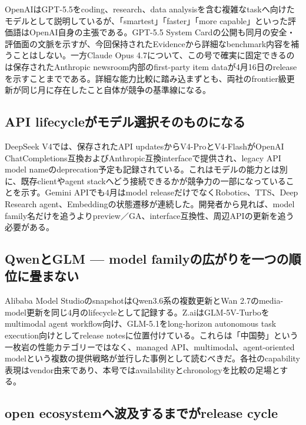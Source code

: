 OpenAIはGPT-5.5をcoding、research、data analysisを含む複雑なtaskへ向けたモデルとして説明しているが、「smartest」「faster」「more capable」といった評価語はOpenAI自身の主張である。GPT-5.5 System Cardの公開も同月の安全・評価面の文脈を示すが、今回保持されたEvidenceから詳細なbenchmark内容を補うことはしない。一方Claude Opus 4.7について、この号で確実に固定できるのは保存されたAnthropic newsroom内部のfirst-party item dataが4月16日のreleaseを示すことまでである。詳細な能力比較に踏み込まずとも、両社のfrontier級更新が同じ月に存在したこと自体が競争の基準線になる。\autocite{src-a07eb39dec04,src-dfe7e0c6ff39,src-f6aa679babd7}


\subsection{API lifecycleがモデル選択そのものになる}

DeepSeek V4では、保存されたAPI updatesからV4-ProとV4-FlashがOpenAI ChatCompletions互換およびAnthropic互換interfaceで提供され、legacy API model nameのdeprecation予定も記録されている。これはモデルの能力とは別に、既存clientやagent stackへどう接続できるかが競争力の一部になっていることを示す。Gemini APIでも4月はmodel releaseだけでなくRobotics、TTS、Deep Research agent、Embeddingの状態遷移が連続した。開発者から見れば、model family名だけを追うよりpreview／GA、interface互換性、周辺APIの更新を追う必要がある。\autocite{src-a24fd97eb3d0,src-e547d0d8cbe3}


\subsection{QwenとGLM — model familyの広がりを一つの順位に畳まない}

Alibaba Model StudioのsnapshotはQwen3.6系の複数更新とWan 2.7のmedia-model更新を同じ4月のlifecycleとして記録する。Z.aiはGLM-5V-Turboをmultimodal agent workflow向け、GLM-5.1をlong-horizon autonomous task execution向けとしてrelease notesに位置付けている。これらは「中国勢」という一枚岩の性能カテゴリーではなく、managed API、multimodal、agent-oriented modelという複数の提供戦略が並行した事例として読むべきだ。各社のcapability表現はvendor由来であり、本号ではavailabilityとchronologyを比較の足場とする。\autocite{src-9156c37fb1c2,src-eac8dfbeb78c}


\subsection{open ecosystemへ波及するまでがrelease cycle}

